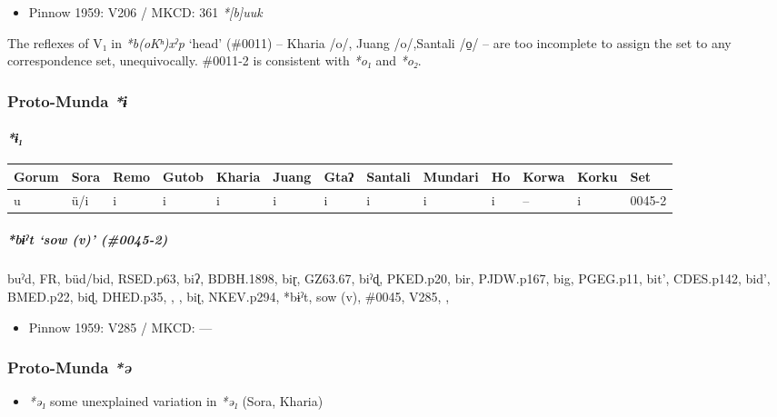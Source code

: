 \documentclass[a4paper,]{article}
\providecommand{\tightlist}{%
  \setlength{\itemsep}{0pt}\setlength{\parskip}{0pt}}
\let\oldparagraph\paragraph
\renewcommand{\paragraph}[1]{\oldparagraph{#1}\mbox{}}
\let\oldsubparagraph\subparagraph
\renewcommand{\subparagraph}[1]{\oldsubparagraph{#1}\mbox{}}
\begin{document}
\begin{itemize}
\tightlist
\item
  Pinnow 1959: V206 / MKCD: 361 \emph{*{[}b{]}uuk}
\end{itemize}

The reflexes of V₁ in \emph{*b(oKʰ)xˀp} `head' (\#0011) -- Kharia /o/,
Juang /o/,Santali /o̠/ -- are too incomplete to assign the set to any
correspondence set, unequivocally. \#0011-2 is consistent with
\emph{*o₁} and \emph{*o₂}.

\subsubsection{\texorpdfstring{Proto-Munda
\emph{*ɨ}}{Proto-Munda *ɨ}}\label{proto-munda-ux268}

\paragraph{\texorpdfstring{\emph{*ɨ₁}}{*ɨ₁}}\label{ux268}

\begin{longtable}[]{@{}lllllllllllll@{}}
\toprule
Gorum & Sora & Remo & Gutob & Kharia & Juang & Gtaʔ & Santali & Mundari
& Ho & Korwa & Korku & Set\tabularnewline
\midrule
\endhead
u & ü/i & i & i & i & i & i & i & i & i & -- & i & 0045-2\tabularnewline
\bottomrule
\end{longtable}

\subparagraph{\texorpdfstring{\emph{*bɨˀt} `sow (v)'
(\#0045-2)}{*bɨˀt sow (v) (\#0045-2)}}\label{bux268ux2c0t-sow-v-0045-2}

buˀd, FR, büd/bid, RSED.p63, biʔ, BDBH.1898, biɽ, GZ63.67, biˀɖ,
PKED.p20, bir, PJDW.p167, big, PGEG.p11, bit', CDES.p142, bid',
BMED.p22, biɖ, DHED.p35, , , biʈ, NKEV.p294, *bɨˀt, sow (v), \#0045,
V285, ,

\begin{itemize}
\tightlist
\item
  Pinnow 1959: V285 / MKCD: ---
\end{itemize}

\subsubsection{\texorpdfstring{Proto-Munda
\emph{*ə}}{Proto-Munda *ə}}\label{proto-munda-ux259}

\begin{itemize}
\tightlist
\item
  \emph{*ə₁} some unexplained variation in \emph{*ə₁} (Sora, Kharia)
\end{itemize}
\end{document}
